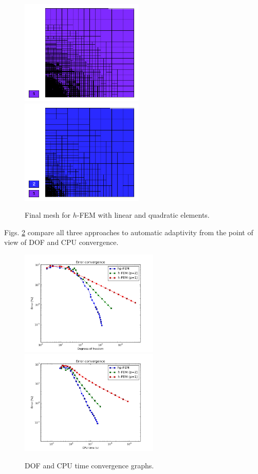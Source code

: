 \documentclass[12pt]{elsarticle}
\begin{document}
\begin{figure}[!ht]
\centering
\includegraphics[height=5cm]{nist/nist-8/mesh_h1_aniso.png}\ \
\includegraphics[height=5cm]{nist/nist-8/mesh_h2_aniso.png}
\caption{Final mesh for $h$-FEM with linear and quadratic elements.}
\label{fig:nist-8-h-aniso}
\end{figure}

Figs. \ref{fig:nist-8-conv} compare all
three approaches to automatic adaptivity from the point
of view of DOF and CPU convergence.

\begin{figure}[!ht]
\centering
\includegraphics[height=5cm]{nist/nist-8/conv_dof_aniso.png}\ \
\includegraphics[height=5cm]{nist/nist-8/conv_cpu_aniso.png}
\caption{DOF and CPU time convergence graphs.}
\label{fig:nist-8-conv}
\end{figure}
\end{document}

